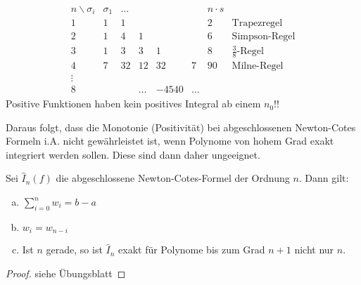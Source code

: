 \begin{align*}
  \begin{array}{cccccccl}
    n\backslash \sigma_i &\sigma_1&\dots&&&& n\cdot s\\
    1 & 1&1&&&&2& \text{Trapezregel}\\
    2&1&4&1&&&6 & \text{Simpson-Regel}\\
    3&1&3&3&1&&8& \text{$\frac{3}{8}$-Regel}\\
    4&7&32&12&32&7&90 & \text{Milne-Regel}\\
    \vdots\\
    8&&&\dots &-4540&\dots
  \end{array}
\end{align*}
Positive Funktionen haben kein positives Integral ab einem $n_0$!!




Daraus folgt, dass die Monotonie (Positivität) 
bei abgeschlossenen Newton-Cotes Formeln i.A. nicht gewährleistet ist,
wenn Polynome von hohem Grad exakt integriert werden sollen.
Diese sind dann daher ungeeignet.


\begin{Satze}\label{7.2.5}
  Sei $\hat{I}_n(f) $ die abgeschlossene Newton-Cotes-Formel
  der Ordnung $n$.
  Dann gilt:
  \begin{enumerate}[a)]
  \item $\sum_{i=0}^nw_i= b-a$
  \item $w_i=w_{n-i}$
  \item Ist $n$ gerade, so ist $\hat{I}_n$ exakt für Polynome bis zum
    Grad $n+1$ nicht nur $n$.
  \end{enumerate}

  \begin{proof} siehe Übungsblatt \end{proof}
\end{Satze}

